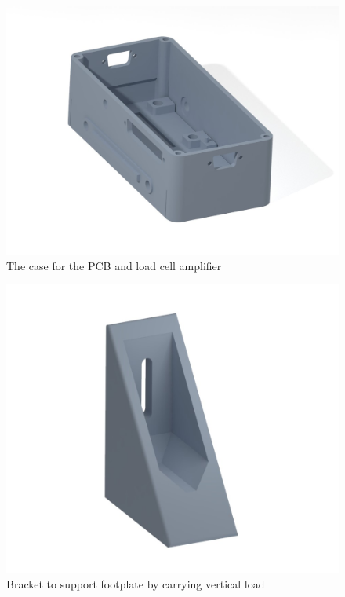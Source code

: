 \documentclass[12pt]{report}
\begin{document}
		\begin{figure}[h] 
		\centering
		\includegraphics[width=\linewidth]{pcb_case01}
		\caption{The case for the PCB and load cell amplifier}
		\label{fig:pcb_case}
	\end{figure}
	
	\begin{figure}[h] 
		\centering
		\includegraphics[width=\linewidth]{bracket02}
		\caption{Bracket to support footplate by carrying vertical load}
		\label{fig:bracket}
	\end{figure}
		
\end{document}
